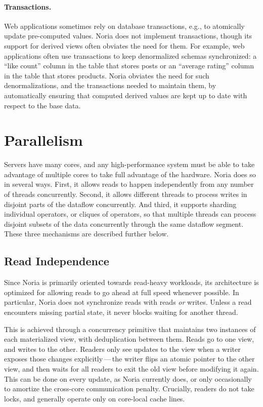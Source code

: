 \paragraph{Transactions.}
Web applications sometimes rely on database transactions, e.g., to atomically
update pre-computed values. Noria does not implement transactions, though its
support for derived views often obviates the need for them. For example, web
applications often use transactions to keep denormalized schemas synchronized: a
``like count'' column in the table that stores posts or an ``average rating''
column in the table that stores products. Noria obviates the need for such
denormalizations, and the transactions needed to maintain them, by automatically
ensuring that computed derived values are kept up to date with respect to the
base data.

\section{Parallelism}

Servers have many cores, and any high-performance system must be able to take
advantage of multiple cores to take full advantage of the hardware. Noria does
so in several ways. First, it allows reads to happen independently from any
number of threads concurrently. Second, it allows different threads to process
writes in disjoint parts of the dataflow concurrently. And third, it supports
sharding individual operators, or cliques of operators, so that multiple threads
can process disjoint subsets of the data concurrently through the same dataflow
segment. These three mechanisms are described further below.

\subsection{Read Independence}

Since Noria is primarily oriented towards read-heavy workloads, its architecture
is optimized for allowing reads to go ahead at full speed whenever possible. In
particular, Noria does not synchronize reads with reads \emph{or} writes. Unless
a read encounters missing partial state, it never blocks waiting for another
thread.

This is achieved through a concurrency primitive that maintains two instances of
each materialized view, with deduplication between them. Reads go to one view,
and writes to the other. Readers only see updates to the view when a writer
exposes those changes explicitly\,---\,the writer flips an atomic pointer to the
other view, and then waits for all readers to exit the old view before modifying
it again. This can be done on every update, as Noria currently does, or only
occasionally to amortize the cross-core communication penalty. Crucially,
readers do not take locks, and generally operate only on core-local cache lines.

